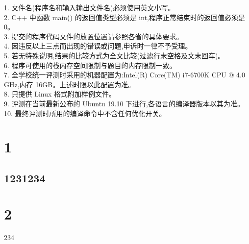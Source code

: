 \documentclass[11pt, a4paper, UTF8]{ctexart}
\begin{document}
    1. 文件名(程序名和输入输出文件名)必须使用英文小写。\\
    2. C++ 中函数 main() 的返回值类型必须是 int,程序正常结束时的返回值必须是 0。\\
    3. 提交的程序代码文件的放置位置请参照各省的具体要求。\\
    4. 因违反以上三点而出现的错误或问题,申诉时一律不予受理。\\
    5. 若无特殊说明,结果的比较方式为全文比较(过滤行末空格及文末回车)。\\
    6. 程序可使用的栈内存空间限制与题目的内存限制一致。\\
    7. 全学校统一评测时采用的机器配置为:Intel(R) Core(TM) i7-6700K CPU @ 4.0 GHz,内存 16GB。上述时限以此配置为准。\\
    8. 只提供 Linux 格式附加样例文件。\\
    9. 评测在当前最新公布的 Ubuntu 19.10 下进行,各语言的编译器版本以其为准。\\
    10. 最终评测时所用的编译命令中不含任何优化开关。\\
	\newpage
	\section{1}
	\subsection{1231234}
	\clearpage
	\section{2}
	234
	\label{lastpage}
\end{document}

